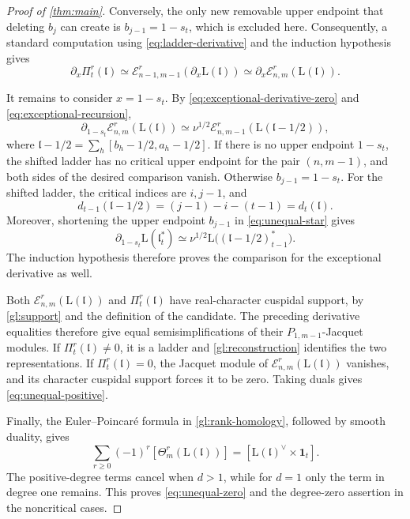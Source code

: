 \documentclass[10pt,a4paper]{article}
\theoremstyle{definition}
\theoremstyle{remark}
\numberwithin{equation}{section}
\newcommand{\fl}{\mathfrak{l}}
\newcommand{\Lrep}{\mathrm{L}}
\newcommand{\cE}{\mathcal{E}}
\newcommand{\one}{\mathbf{1}}
\begin{document}
\begin{proof}[Proof of \cref{thm:main}]
Conversely, the only new removable upper endpoint that deleting $b_j$ can create
is $b_{j-1}=1-s_t$, which is excluded here. Consequently, a standard
computation using \eqref{eq:ladder-derivative} and the induction
hypothesis gives
\[
 \partial_x \Pi^r_t(\fl)
 \simeq\cE^r_{n-1,m-1}(\partial_x\Lrep(\fl))
 \simeq\partial_x\cE^r_{n,m}(\Lrep(\fl)).
\]

It remains to consider $x=1-s_t$. By
\eqref{eq:exceptional-derivative-zero} and
\eqref{eq:exceptional-recursion},
\[
 \partial_{1-s_t}\cE^r_{n,m}(\Lrep(\fl))
 \simeq\nu^{1/2}\cE^r_{n,m-1}(\Lrep(\fl-1/2)),
\]
where $\fl-1/2=\sum_h[b_h-1/2,a_h-1/2]$. If there is no upper endpoint
$1-s_t$, the shifted ladder has no critical upper endpoint for the pair
$(n,m-1)$, and both sides of the desired comparison vanish. Otherwise
$b_{j-1}=1-s_t$. For the shifted ladder, the critical indices are
$i,j-1$, and
\[
 d_{t-1}(\fl-1/2)=(j-1)-i-(t-1)=d_t(\fl).
\]
Moreover, shortening the upper endpoint $b_{j-1}$ in \eqref{eq:unequal-star}
gives
\[
 \partial_{1-s_t}\Lrep(\fl_t^*)
 \simeq\nu^{1/2}\Lrep\bigl((\fl-1/2)_{t-1}^*\bigr).
\]
The induction hypothesis therefore proves the comparison for the
exceptional derivative as well.

Both $\cE^r_{n,m}(\Lrep(\fl))$ and $\Pi^r_t(\fl)$ have real-character
cuspidal support, by \cref{gl:support} and the definition of the candidate.
The preceding derivative equalities therefore give equal
semisimplifications of their $P_{1,m-1}$-Jacquet modules.
If $\Pi^r_t(\fl)\ne0$, it is a ladder and \cref{gl:reconstruction}
identifies the two representations. If $\Pi^r_t(\fl)=0$, the Jacquet
module of $\cE^r_{n,m}(\Lrep(\fl))$ vanishes, and its
character cuspidal support forces it to be zero. Taking duals gives
\eqref{eq:unequal-positive}.

Finally, the Euler--Poincar\'e formula in
\cref{gl:rank-homology}, followed by smooth duality, gives
\[
 \sum_{r\geq0}(-1)^r[\Theta_m^r(\Lrep(\fl))]
 =[\Lrep(\fl)^\vee\times\one_t].
\]
The positive-degree terms cancel when $d>1$, while for $d=1$ only
the term in degree one remains. This proves \eqref{eq:unequal-zero}
and the degree-zero assertion in the noncritical cases.
\end{proof}
\end{document}
